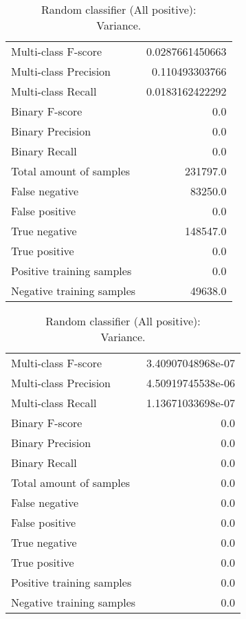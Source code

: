 \begin{table}[H]
\begin{minipage}{0.5\textwidth}
\caption{Random classifier (All positive): \\Average.}
\centering
\begin{tabular}{l r}
\toprule
Multi-class F-score & 0.0287661450663 \\
Multi-class Precision & 0.110493303766 \\
Multi-class Recall & 0.0183162422292 \\
\midrule
Binary F-score & 0.0 \\
Binary Precision & 0.0 \\
Binary Recall & 0.0 \\
\midrule
Total amount of samples & 231797.0 \\
False negative & 83250.0 \\
False positive & 0.0 \\
True negative & 148547.0 \\
True positive & 0.0 \\
\midrule
Positive training samples & 0.0 \\
Negative training samples & 49638.0 \\
\bottomrule
\end{tabular}
\end{minipage}
\hfillx
\begin{minipage}{0.5\textwidth}
\caption{Random classifier (All positive): \\Variance.}
\centering
\begin{tabular}{l r}
\toprule
Multi-class F-score & 3.40907048968e-07 \\
Multi-class Precision & 4.50919745538e-06 \\
Multi-class Recall & 1.13671033698e-07 \\
\midrule
Binary F-score & 0.0 \\
Binary Precision & 0.0 \\
Binary Recall & 0.0 \\
\midrule
Total amount of samples & 0.0 \\
False negative & 0.0 \\
False positive & 0.0 \\
True negative & 0.0 \\
True positive & 0.0 \\
\midrule
Positive training samples & 0.0 \\
Negative training samples & 0.0 \\
\bottomrule
\end{tabular}
\end{minipage}
\end{table}

